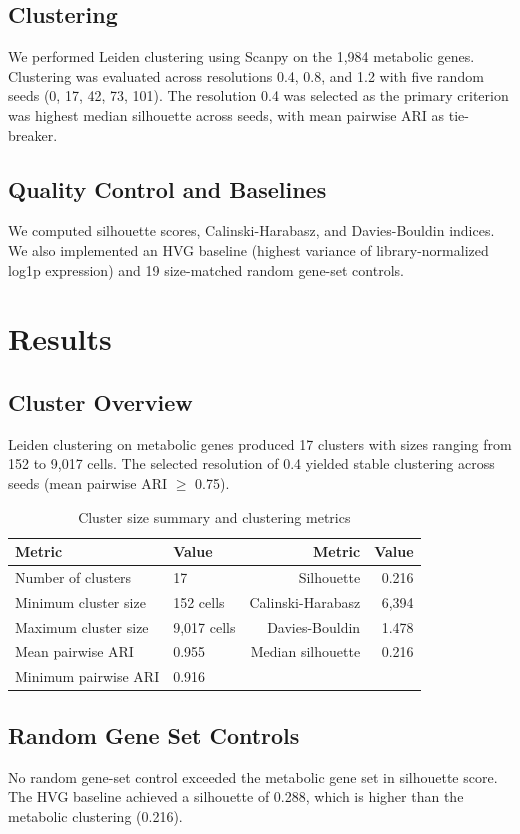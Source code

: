 \documentclass[11pt,a4paper]{article}
\begin{document}
\subsection{Clustering}
We performed Leiden clustering using Scanpy on the 1,984 metabolic genes. Clustering was evaluated across resolutions 0.4, 0.8, and 1.2 with five random seeds (0, 17, 42, 73, 101). The resolution 0.4 was selected as the primary criterion was highest median silhouette across seeds, with mean pairwise ARI as tie-breaker.

\subsection{Quality Control and Baselines}
We computed silhouette scores, Calinski-Harabasz, and Davies-Bouldin indices. We also implemented an HVG baseline (highest variance of library-normalized log1p expression) and 19 size-matched random gene-set controls.

\section{Results}

\subsection{Cluster Overview}
Leiden clustering on metabolic genes produced 17 clusters with sizes ranging from 152 to 9,017 cells. The selected resolution of 0.4 yielded stable clustering across seeds (mean pairwise ARI $\ge$ 0.75).

\begin{table}[h!]
\centering
\caption{Cluster size summary and clustering metrics}
\label{tab:clusters}
\begin{tabular}{llrr}
\toprule
Metric & Value & Metric & Value \\
\midrule
Number of clusters & 17 & Silhouette & 0.216 \\
Minimum cluster size & 152 cells & Calinski-Harabasz & 6,394 \\
Maximum cluster size & 9,017 cells & Davies-Bouldin & 1.478 \\
Mean pairwise ARI & 0.955 & Median silhouette & 0.216 \\
Minimum pairwise ARI & 0.916 & & \\
\bottomrule
\end{tabular}
\end{table}

\subsection{Random Gene Set Controls}
No random gene-set control exceeded the metabolic gene set in silhouette score. The HVG baseline achieved a silhouette of 0.288, which is higher than the metabolic clustering (0.216).
\end{document}
